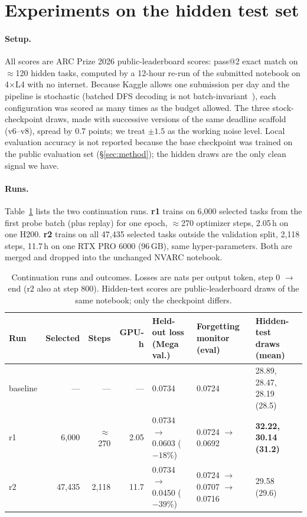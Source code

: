 \documentclass[11pt]{article}
\newcommand{\nvarc}{NVARC}
\begin{document}
\section{Experiments on the hidden test set}
\label{sec:results}

\paragraph{Setup.}
All scores are ARC Prize 2026 public-leaderboard scores: pass@2 exact match on $\approx$120 hidden tasks, computed by a 12-hour re-run of the submitted notebook on 4$\times$L4 with no internet. Because Kaggle allows one submission per day and the pipeline is stochastic (batched DFS decoding is not batch-invariant~\citep{nvarc2025}), each configuration was scored as many times as the budget allowed. The three stock-checkpoint draws, made with successive versions of the same deadline scaffold (v6--v8), spread by 0.7 points; we treat $\pm1.5$ as the working noise level. Local evaluation accuracy is not reported because the base checkpoint was trained on the public evaluation set (\S\ref{sec:method}); the hidden draws are the only clean signal we have.

\paragraph{Runs.}
Table~\ref{tab:runs} lists the two continuation runs. \textbf{r1} trains on 6{,}000 selected tasks from the first probe batch (plus replay) for one epoch, $\approx$270 optimizer steps, 2.05\,h on one H200. \textbf{r2} trains on all 47{,}435 selected tasks outside the validation split, 2{,}118 steps, 11.7\,h on one RTX PRO 6000 (96\,GB), same hyper-parameters. Both are merged and dropped into the unchanged \nvarc{} notebook.

\begin{table}[t]
\centering\footnotesize\setlength{\tabcolsep}{4pt}
\caption{Continuation runs and outcomes. Losses are nats per output token, step 0 $\to$ end (r2 also at step 800). Hidden-test scores are public-leaderboard draws of the same notebook; only the checkpoint differs.}
\label{tab:runs}
\begin{tabular}{lrrrlll}
\toprule
Run & Selected & Steps & GPU-h & Held-out loss (Mega val.) & Forgetting monitor (eval) & Hidden-test draws (mean) \\
\midrule
baseline & --- & --- & --- & 0.0734 & 0.0724 & 28.89, 28.47, 28.19 (28.5)\\
r1 & 6{,}000 & $\approx$270 & 2.05 & 0.0734 $\to$ 0.0603 ($-18\%$) & 0.0724 $\to$ 0.0692 & \textbf{32.22, 30.14 (31.2)}\\
r2 & 47{,}435 & 2{,}118 & 11.7 & 0.0734 $\to$ 0.0450 ($-39\%$) & 0.0724 $\to$ 0.0707 $\to$ 0.0716 & 29.58 (29.6)\\
\bottomrule
\end{tabular}
\end{table}
\end{document}
